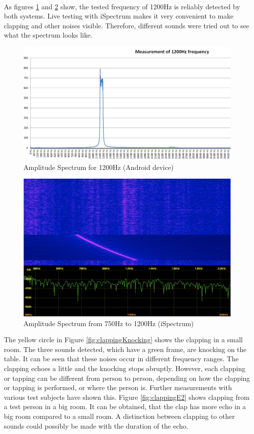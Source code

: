 \\
As figures \ref{fig:1200HzAndroid} and \ref{fig:1200HziSpectrum} show, the tested frequency of 1200Hz is reliably detected by both systems. Live testing with iSpectrum makes it very convenient to make clapping and other noises visible. Therefore, different sounds were tried out to see what the spectrum looks like.
\begin{figure}[h]
	\centering
	\includegraphics[width=.9\textwidth]{imgs/yt1200Hz}
	\caption{Amplitude Spectrum for 1200Hz (Android device)}
	\label{fig:1200HzAndroid}
\end{figure}
\newpage
\begin{figure}[h]
	\centering
	\includegraphics[width=.8\textwidth]{imgs/iSpectrum1200Hz}
	\caption{Amplitude Spectrum from 750Hz to 1200Hz (iSpectrum)}
	\label{fig:1200HziSpectrum}
\end{figure}
The yellow circle in Figure \ref{fig:clappingKnocking} shows the clapping in a small room. The three sounds detected, which have a green frame, are knocking on the table. It can be seen that these noises occur in different frequency ranges. The clapping echoes a little and the knocking stops abruptly. However, each clapping or tapping can be different from person to person, depending on how the clapping or tapping is performed, or where the person is. Further measurements with various test subjects have shown this. Figure \ref{fig:clappingE2} shows clapping from a test person in a big room. It can be obtained, that the clap has more echo in a big room compared to a small room. A distinction between clapping to other sounds could possibly be made with the duration of the echo.
